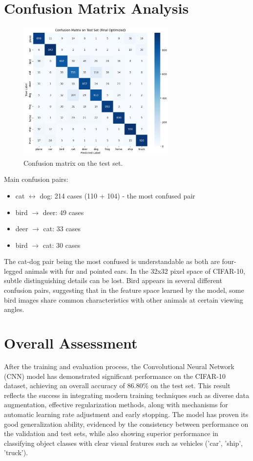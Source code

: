 \documentclass[12pt, a4paper, openany]{report}
\begin{document}
 \section{Confusion Matrix Analysis} %
 \begin{figure}[H]
     \centering
     \includegraphics[width=0.7\textwidth]{confusion_matrix.png}
     \caption{Confusion matrix on the test set.} %
     \label{fig:confusion_matrix}
 \end{figure}
 Main confusion pairs:
 \begin{itemize}
     \item cat $\leftrightarrow$ dog: 214 cases (110 + 104) - the most confused pair %
     \item bird $\rightarrow$ deer: 49 cases %
     \item deer $\rightarrow$ cat: 33 cases %
     \item bird $\rightarrow$ cat: 30 cases %
 \end{itemize}

 The cat-dog pair being the most confused is understandable as both are four-legged animals with fur and pointed ears. In the 32x32 pixel space of CIFAR-10, subtle distinguishing details can be lost. Bird appears in several different confusion pairs, suggesting that in the feature space learned by the model, some bird images share common characteristics with other animals at certain viewing angles.

 \section{Overall Assessment} %
 After the training and evaluation process, the Convolutional Neural Network (CNN) model has demonstrated significant performance on the CIFAR-10 dataset, achieving an overall accuracy of 86.80\% on the test set. This result reflects the success in integrating modern training techniques such as diverse data augmentation, effective regularization methods, along with mechanisms for automatic learning rate adjustment and early stopping. The model has proven its good generalization ability, evidenced by the consistency between performance on the validation and test sets, while also showing superior performance in classifying object classes with clear visual features such as vehicles ('car', 'ship', 'truck').
\end{document}
